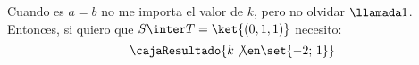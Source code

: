 \begin{enumerate}[label=(\alph*)]
        Cuando es $a = b$ no me importa el valor de $k$,  pero no olvidar $\llamada1$.
        Entonces, si quiero que $S \inter T = \ket{(0,1,1)}$ necesito:
        $$
          \cajaResultado{
            k \not\en \set{-2;\, 1}
          }
        $$
\end{enumerate}

\begin{aportes}
  \item {}
\end{aportes}
